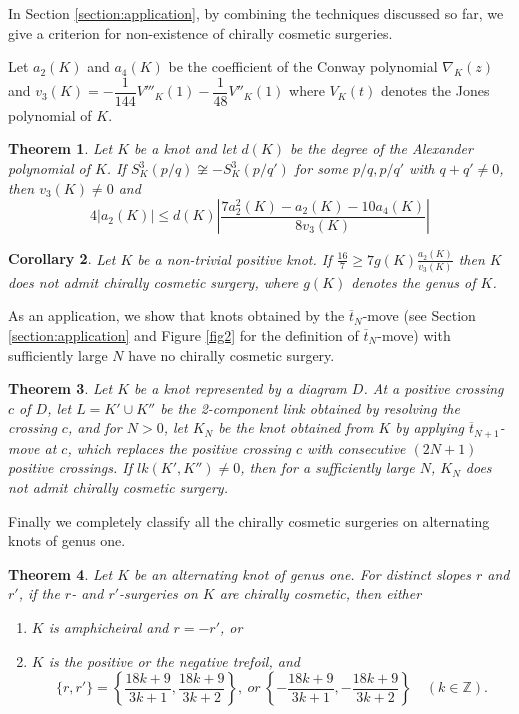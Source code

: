 \documentclass{amsart}
\newtheorem{theorem}{Theorem}[section]
\newtheorem{corollary}[theorem]{Corollary}
\theoremstyle{remark}
\theoremstyle{definition}
\begin{document}
{
In Section \ref{section:application}, by combining the techniques discussed so far, we give a criterion for non-existence of chirally cosmetic surgeries.

Let $a_2(K)$ and $a_4(K)$ be the coefficient of the Conway polynomial $\nabla_K(z)$ and $v_{3}(K)= -\dfrac{1}{144}V'''_{K}(1)-\dfrac{1}{48}V''_{K}(1)$ where $V_K(t)$ denotes the Jones polynomial of $K$.

\setcounter{section}{6}
\setcounter{theorem}{0}
\begin{theorem}
Let $K$ be a knot and let $d(K)$ be the degree of the Alexander polynomial of $K$. If $S^{3}_{K}(p\slash q) \not\cong -S^{3}_{K}(p\slash q')$ for some $p/q,p/q'$ with $q+q'\neq 0$, then $v_3(K)\neq 0$ and
\[ 4|a_2(K)| \leq d(K) \left| \frac{7a_2^{2}(K)-a_2(K)-10a_4(K)}{8v_3(K)} \right|\]
\end{theorem}

\begin{corollary}
Let $K$ be a non-trivial positive knot. If $\frac{16}{7} \geq 7g(K)\frac{a_2(K)}{v_3(K)}$ then $K$ does not admit chirally cosmetic surgery, where $g(K)$ denotes the genus of $K$.
\end{corollary}

As an application, we show that knots obtained by the $\overline{t}_{N}$-move (see Section \ref{section:application} and Figure \ref{fig2} for the definition of $\overline{t}_{N}$-move) with sufficiently large $N$ have no chirally cosmetic surgery.

\begin{theorem}
Let $K$ be a knot represented by a diagram $D$.
At a positive crossing $c$ of $D$, let $L=K' \cup K''$ be the 2-component link obtained by resolving the crossing $c$, and for $N>0$, let $K_{N}$ be the knot obtained from $K$ by applying $\overline{t}_{N+1}$-move at $c$, which replaces the positive crossing $c$ with consecutive $(2N+1)$ positive crossings.
If $lk(K',K'')\neq 0$, then for a sufficiently large $N$, $K_N$ does not admit chirally cosmetic surgery.
\end{theorem}



Finally we completely classify all the chirally cosmetic surgeries on alternating knots of genus one. 

\setcounter{section}{6}
\setcounter{theorem}{2}
\begin{theorem}
Let $K$ be an alternating knot of genus one. 
For distinct slopes $r$ and $r'$, if the $r$- and $r'$-surgeries on $K$ are chirally cosmetic, 
then either
\begin{enumerate}
\item[(i)] $K$ is amphicheiral and $r=-r'$, or 
\item[(ii)] $K$ is the positive or the negative trefoil, and 
\[ \{r,r'\} = 
\left\{\frac{18k+9}{3k+1}, \frac{18k+9}{3k+2} \right\},\ \mathit{or}\ 
\left\{- \frac{18k+9}{3k+1}, - \frac{18k+9}{3k+2} \right\} \quad (k \in \mathbb{Z}).\]
\end{enumerate}
\end{theorem}

}
\setcounter{section}{1}
\end{document}
